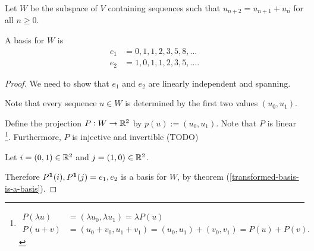 Let $W$ be the subspace of $V$ containing sequences such that $u_{n+2} = u_{n+1} + u_n$ for all
$n \geq 0$.

\begin{comment}
  \begin{proof}
    $W$ is a subspace because:
    \begin{enumerate}
    \item $W$ contains the zero sequence.
    \item Let $(u)_{n\geq 0}, (v)_{n\geq 0} \in W$. Then
      $$(u + v)_{n+2} = u_{n+1} + u_n + v_{n + 1} + v_n = (u + v)_{n+1} + (u + v)_n,$$ and
      $$(\lambda u)_{n+2} = \lambda u_{n+1} + \lambda u_n = (\lambda u)_{n+1} + (\lambda u)_n.$$
    \end{enumerate}
  \end{proof}
\end{comment}


\begin{claim*}
  A basis for $W$ is
  \begin{align*}
    e_1 &= 0, 1, 1, 2, 3, 5, 8, \ldots\\
    e_2 &= 1, 0, 1, 1, 2, 3, 5, \ldots.
  \end{align*}
\end{claim*}

\begin{proof} We need to show that $e_1$ and $e_2$ are linearly independent and spanning.

  Note that every sequence $u \in W$ is determined by the first two values $(u_0, u_1)$.

  Define the projection $P: W \to \mathbb{R}^2$ by $p(u) := (u_0, u_1)$. Note that $P$ is linear \footnote{
    \begin{align*}
      P(\lambda u) &= (\lambda u_0, \lambda u_1) = \lambda P(u)\\
      P(u + v)     &= (u_0 + v_0, u_1 + v_1) = (u_0, u_1) + (v_0, v_1) = P(u) + P(v).
    \end{align*}
  }.
  Furthermore, $P$ is injective and invertible (TODO)

  Let $i = (0, 1) \in \mathbb{R}^2$ and $j = (1, 0) \in \mathbb{R}^2$.

  Therefore $P^{\mathbf 1}(i), P^{\mathbf 1}(j) = e_1, e_2$ is a basis for $W$, by theorem
  (\ref{transformed-basis-is-a-basis}).

\end{proof}

